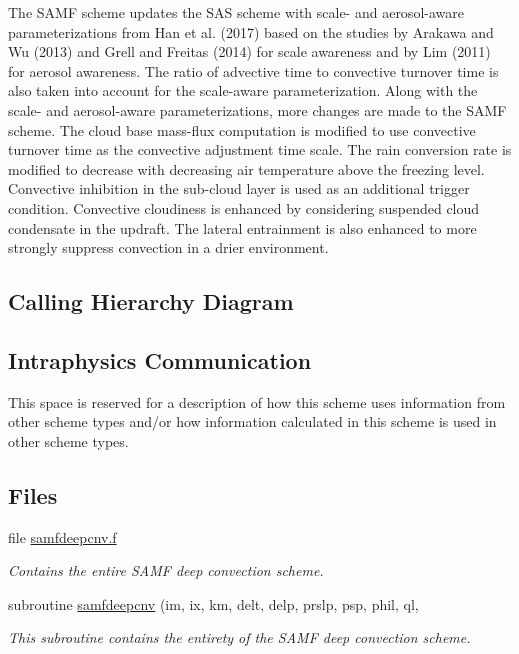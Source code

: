 The S\+A\+MF scheme updates the S\+AS scheme with scale-\/ and aerosol-\/aware parameterizations from Han et al. (2017) \cite{han_et_al_2017} based on the studies by Arakawa and Wu (2013) \cite{arakawa_and_wu_2013} and Grell and Freitas (2014) \cite{grell_and_freitus_2014} for scale awareness and by Lim (2011) \cite{lim_2011} for aerosol awareness. The ratio of advective time to convective turnover time is also taken into account for the scale-\/aware parameterization. Along with the scale-\/ and aerosol-\/aware parameterizations, more changes are made to the S\+A\+MF scheme. The cloud base mass-\/flux computation is modified to use convective turnover time as the convective adjustment time scale. The rain conversion rate is modified to decrease with decreasing air temperature above the freezing level. Convective inhibition in the sub-\/cloud layer is used as an additional trigger condition. Convective cloudiness is enhanced by considering suspended cloud condensate in the updraft. The lateral entrainment is also enhanced to more strongly suppress convection in a drier environment.\hypertarget{group___g_f_s___n_s_s_t_diagram}{}\subsection{Calling Hierarchy Diagram}\label{group___g_f_s___n_s_s_t_diagram}
 \hypertarget{group___g_f_s___n_s_s_t_intraphysics}{}\subsection{Intraphysics Communication}\label{group___g_f_s___n_s_s_t_intraphysics}
This space is reserved for a description of how this scheme uses information from other scheme types and/or how information calculated in this scheme is used in other scheme types. \subsection*{Files}
\begin{DoxyCompactItemize}
\item 
file \hyperlink{samfdeepcnv_8f}{samfdeepcnv.\+f}
\begin{DoxyCompactList}\small\item\em Contains the entire S\+A\+MF deep convection scheme. \end{DoxyCompactList}\end{DoxyCompactItemize}
\begin{DoxyCompactItemize}
\item 
subroutine \hyperlink{group___s_a_m_f_ga244f59e0ba7be1c351a58ddda611173e}{samfdeepcnv} (im, ix, km, delt, delp, prslp, psp, phil, ql,
\begin{DoxyCompactList}\small\item\em This subroutine contains the entirety of the S\+A\+MF deep convection scheme. \end{DoxyCompactList}\end{DoxyCompactItemize}


